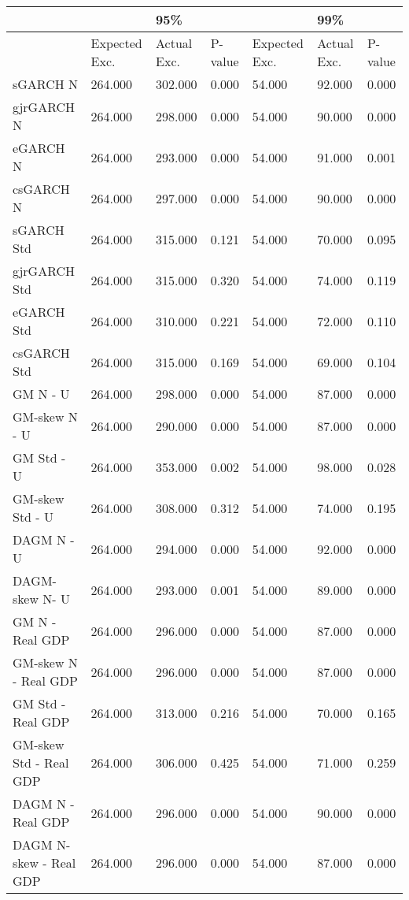 \documentclass{article}
\begin{document}


\begin{table}[ht]\small
\begin{tabular}{|l|lll|lll|}
\hline
& & 95\% & & & 99\% &\\
  \hline
 & Expected Exc. & Actual Exc. & P-value  & Expected Exc. & Actual Exc. & P-value\\
  \hline
sGARCH N & 264.000 & 302.000 & 0.000 & 54.000 & 92.000 & 0.000 \\
  gjrGARCH N & 264.000 & 298.000 & 0.000 & 54.000 & 90.000 & 0.000 \\
  eGARCH N & 264.000 & 293.000 & 0.000 & 54.000 & 91.000 & 0.001 \\ 
  csGARCH N & 264.000 & 297.000 & 0.000  & 54.000 & 90.000 & 0.000 \\
  sGARCH Std & 264.000 & 315.000 & 0.121  & 54.000 & 70.000 & 0.095 \\ 
  gjrGARCH Std & 264.000 & 315.000 & 0.320   & 54.000 & 74.000 & 0.119 \\ 
  eGARCH Std & 264.000 & 310.000 & 0.221  & 54.000 & 72.000 & 0.110 \\
  csGARCH Std & 264.000 & 315.000 & 0.169   & 54.000 & 69.000 & 0.104 \\ 
  GM N - U & 264.000 & 298.000 & 0.000  & 54.000 & 87.000 & 0.000 \\
  GM-skew N - U & 264.000 & 290.000 & 0.000   & 54.000 & 87.000 & 0.000 \\ 
  GM Std - U & 264.000 & 353.000 & 0.002 & 54.000 & 98.000 & 0.028 \\ 
  GM-skew Std - U & 264.000 & 308.000 & 0.312  & 54.000 & 74.000 & 0.195 \\ 
  DAGM N - U & 264.000 & 294.000 & 0.000 & 54.000 & 92.000 & 0.000 \\ 
  DAGM-skew  N- U & 264.000 & 293.000 & 0.001  & 54.000 & 89.000 & 0.000 \\ 
  GM N - Real GDP & 264.000 & 296.000 & 0.000  & 54.000 & 87.000 & 0.000 \\ 
  GM-skew N - Real GDP & 264.000 & 296.000 & 0.000   & 54.000 & 87.000 & 0.000 \\ 
  GM Std - Real GDP & 264.000 & 313.000 & 0.216  & 54.000 & 70.000 & 0.165 \\
  GM-skew Std - Real GDP & 264.000 & 306.000 & 0.425  & 54.000 & 71.000 & 0.259 \\
  DAGM N - Real GDP & 264.000 & 296.000 & 0.000  & 54.000 & 90.000 & 0.000 \\ 
  DAGM N-skew - Real GDP & 264.000 & 296.000 & 0.000   & 54.000 & 87.000 & 0.000 \\

\end{tabular}
\end{table}
\end{document}
